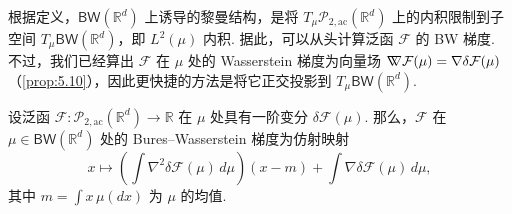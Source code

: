 根据定义，$\mathsf{BW}(\mathbb R^d)$ 上诱导的黎曼结构，是将 $T_\mu\mathcal P_{2,\mathrm{ac}}(\mathbb R^d)$ 上的内积限制到子空间 $T_\mu\mathsf{BW}(\mathbb R^d)$，即 $L^2(\mu)$ 内积. 据此，可以从头计算泛函 $\mathcal F$ 的 BW 梯度. 不过，我们已经算出 $\mathcal F$ 在 $\mu$ 处的 Wasserstein 梯度为向量场 $\nabla\mkern-10mu\nabla\mathcal F(\mu)=\nabla\delta\mathcal F(\mu)$（\autoref{prop:5.10}），因此更快捷的方法是将它正交投影到 $T_\mu\mathsf{BW}(\mathbb R^d)$.

\begin{theorem}\label{thm:5.21}
设泛函 $\mathcal F:\mathcal P_{2,\mathrm{ac}}(\mathbb R^d)\to\mathbb R$ 在 $\mu$ 处具有一阶变分 $\delta\mathcal F(\mu)$. 那么，$\mathcal F$ 在 $\mu\in\mathsf{BW}(\mathbb R^d)$ 处的 Bures--Wasserstein 梯度为仿射映射
$$
x\mapsto\left(\int\nabla^2\delta\mathcal F(\mu)\,d\mu\right)(x-m)
+\int\nabla\delta\mathcal F(\mu)\,d\mu,
$$
其中 $m=\int x\,\mu(dx)$ 为 $\mu$ 的均值.
\end{theorem}
